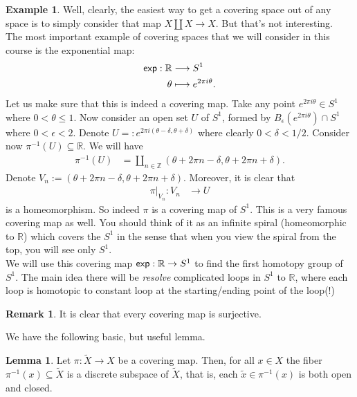 \documentclass[letterpaper,11pt,twoside]{article}
\theoremstyle{definition}
\theoremstyle{definition}
\theoremstyle{definition}
\newtheorem{remark}[proposition]{\textbf{Remark}}
\theoremstyle{definition}
\newtheorem{lemma}[proposition]{\textbf{Lemma}}
\theoremstyle{definition}
\newtheorem*{example}{\textbf{Example}}
\theoremstyle{definition}
\theoremstyle{remark}
\theoremstyle{definition}
\newcommand{\rest}[2]{\left. { #1 }\right \vert_{#2}}
\newcommand{\R}[0]{\mathbb{R}}
\renewcommand{\exp}[0]{{\fontfamily{lmss}\selectfont 
        \text{exp}
}}
\newcommand{\Z}[0]{\mathbb{Z}}
\begin{document}
\begin{example}
    Well, clearly, the easiest way to get a covering space out of any space is to simply consider that map $X\amalg X \to X$. But that's not interesting. \\
    The most important example of covering spaces that we will consider in this course is the exponential map:
    \begin{align*}
        \exp : \R &\longrightarrow S^1\\
        \theta&\longmapsto e^{2\pi i\theta}.
    \end{align*}
Let us make sure that this is indeed a covering map. Take any point $e^{2\pi i \theta} \in S^1$ where $0<\theta \le1$. Now consider an open set $U$ of $S^1$, formed by $B_\epsilon(e^{2\pi i \theta}) \cap S^1$ where $0< \epsilon <2$. Denote $U =: e^{2\pi i (\theta - \delta , \theta + \delta)}$ where clearly $0 <\delta <1/2$. Consider now $\pi^{-1}(U) \subseteq \R$. We will have 
    \begin{align*}
        \pi^{-1}(U) &= \coprod_{n\in \Z} (\theta +2\pi n-\delta , \theta + 2\pi n+ \delta).
    \end{align*}
    Denote $V_n:= (\theta + 2\pi n -\delta, \theta + 2\pi n+ \delta)$. Moreover, it is clear that 
    \begin{align*}
        \rest{\pi}{V_n} : V_n &\longrightarrow U
    \end{align*}
    is a homeomorphism. So indeed $\pi$ is a covering map of $S^1$. This is a very famous covering map as well. You should think of it as an infinite spiral (homeomorphic to $\R$) which covers the $S^1$ in the sense that when you view the spiral from the top, you will see only $S^1$. \\
    
    We will use this covering map $\exp : \R \to S^1$ to find the first homotopy group of $S^1$. The main idea there will be \textit{resolve} complicated loops in $S^1$ to $\R$, where each loop is homotopic to constant loop at the starting/ending point of the loop(!)
\end{example}
\begin{remark}
It is clear that every covering map is surjective.
\end{remark}
We have the following basic, but useful lemma.
\begin{lemma}\label{L-5.0.3}
Let $\pi : \tilde{X} \to X$ be a covering map. Then, for all $x\in X$ the fiber $\pi^{-1}(x) \subseteq \tilde{X}$ is a discrete subspace of $\tilde{X}$, that is, each $\tilde{x}\in \pi^{-1}(x)$ is both open and closed.
\end{lemma}
\end{document}
